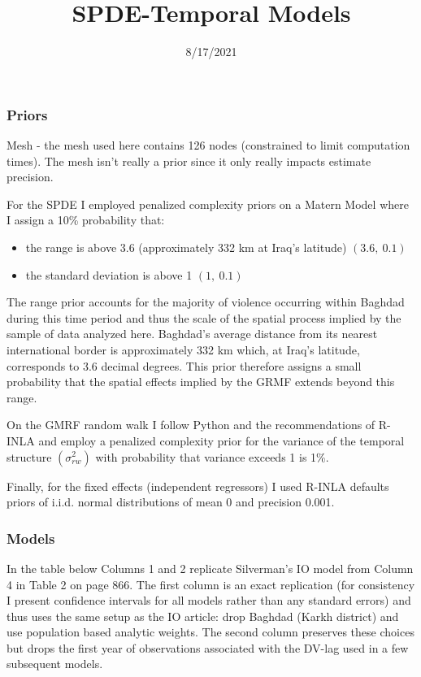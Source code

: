 \documentclass[
  12pt,
]{article}
\title{SPDE-Temporal Models}
\author{}
\date{\vspace{-2.5em}8/17/2021}
\providecommand{\tightlist}{%
  \setlength{\itemsep}{0pt}\setlength{\parskip}{0pt}}
\begin{document}
\maketitle

\hypertarget{priors}{%
\subsubsection{Priors}\label{priors}}

Mesh - the mesh used here contains 126 nodes (constrained to limit computation times). The mesh isn't really a prior since it only really impacts estimate precision.

For the SPDE I employed penalized complexity priors on a Matern Model where I assign a 10\% probability that:

\begin{itemize}
\tightlist
\item
  the range is above 3.6 (approximately 332 km at Iraq's latitude) \((3.6,\ 0.1)\)
\item
  the standard deviation is above 1 \((1,\ 0.1)\)
\end{itemize}

The range prior accounts for the majority of violence occurring within Baghdad during this time period and thus the scale of the spatial process implied by the sample of data analyzed here. Baghdad's average distance from its nearest international border is approximately 332 km which, at Iraq's latitude, corresponds to 3.6 decimal degrees. This prior therefore assigns a small probability that the spatial effects implied by the GRMF extends beyond this range.

On the GMRF random walk I follow Python and the recommendations of R-INLA and employ a penalized complexity prior for the variance of the temporal structure \((\sigma_{rw}^2)\) with probability that variance exceeds 1 is 1\%.

Finally, for the fixed effects (independent regressors) I used R-INLA defaults priors of i.i.d. normal distributions of mean 0 and precision 0.001.

\hypertarget{models}{%
\subsubsection{Models}\label{models}}

In the table below Columns 1 and 2 replicate Silverman's IO model from Column 4 in Table 2 on page 866. The first column is an exact replication (for consistency I present confidence intervals for all models rather than any standard errors) and thus uses the same setup as the IO article: drop Baghdad (Karkh district) and use population based analytic weights. The second column preserves these choices but drops the first year of observations associated with the DV-lag used in a few subsequent models.
\end{document}
